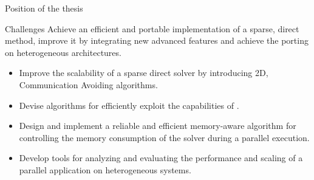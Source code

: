 \begin{frame}{Position of the thesis}

  \vspace{0.3cm}
  
  \begin{block}{Challenges}
    Achieve an efficient and portable implementation of a sparse,
    direct method, improve it by integrating new advanced features and
    achieve the porting on heterogeneous architectures.
  \end{block}

  \vspace{0.3cm}


  \vspace{0.1cm}

  \begin{itemize}
  \item<2-> Improve the scalability of a sparse direct solver by
    introducing 2D, Communication Avoiding algorithms.
  \item<3-> Devise algorithms for efficiently exploit the capabilities
    of .
  \item<4-> Design and implement a reliable and efficient \alert{memory-aware}
    algorithm for controlling the memory consumption of the solver
    during a parallel execution.
  \item<5-> Develop tools for \alert{analyzing and evaluating} the performance and
    scaling of a parallel application on heterogeneous systems.
  \end{itemize}
  
\end{frame}

